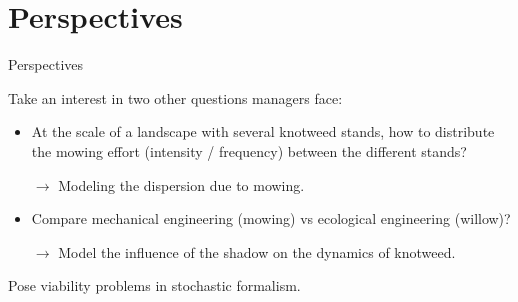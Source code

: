 \documentclass{myBeamer}
\begin{document}











\section*{Perspectives}
\begin{frame}{Perspectives}


\bigbreak
\textcolor{primaryGreenOM}{Take an interest in two other questions managers face:} 
\begin{itemize}
\item At the scale of a landscape with several knotweed stands, how to distribute the mowing effort (intensity / frequency) between the different stands?

$\rightarrow$  Modeling the dispersion due to mowing.

\item Compare mechanical engineering (mowing) vs ecological engineering (willow)? 

$\rightarrow$  Model the influence of the shadow on the dynamics of knotweed.
\end{itemize}

\bigbreak
\textcolor{primaryGreenOM}{Pose viability problems in stochastic formalism.}
\end{frame}
\end{document}
